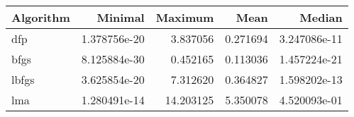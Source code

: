 \begin{tabular}{lrrrr}
\toprule
Algorithm &      Minimal &   Maximum &     Mean &       Median \\
\midrule
      dfp & 1.378756e-20 &  3.837056 & 0.271694 & 3.247086e-11 \\
     bfgs & 8.125884e-30 &  0.452165 & 0.113036 & 1.457224e-21 \\
    lbfgs & 3.625854e-20 &  7.312620 & 0.364827 & 1.598202e-13 \\
      lma & 1.280491e-14 & 14.203125 & 5.350078 & 4.520093e-01 \\
\bottomrule
\end{tabular}
